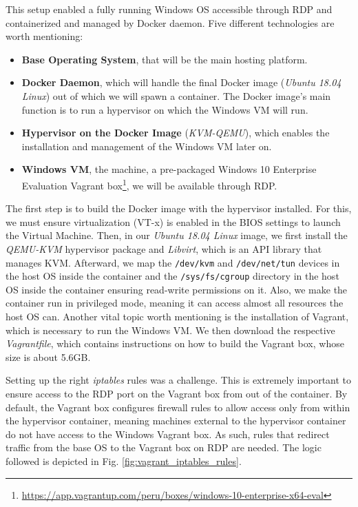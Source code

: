 This setup enabled a fully running Windows OS accessible through RDP and containerized and managed by Docker daemon. Five different technologies are worth mentioning:

\begin{itemize}
    \item \textbf{Base Operating System}, that will be the main hosting platform.
    \item \textbf{Docker Daemon}, which will handle the final Docker image (\textit{Ubuntu 18.04 Linux}) out of which we will spawn a container. The Docker image's main function is to run a hypervisor on which the Windows VM will run.
    \item \textbf{Hypervisor on the Docker Image} (\textit{KVM-QEMU}), which enables the installation and management of the Windows VM later on.
    \item \textbf{Windows VM}, the machine, a pre-packaged Windows 10 Enterprise Evaluation Vagrant box\footnote{\url{https://app.vagrantup.com/peru/boxes/windows-10-enterprise-x64-eval}}, we will be available through RDP.
\end{itemize}

The first step is to build the Docker image with the hypervisor installed. For this, we must ensure virtualization (VT-x) is enabled in the BIOS settings to launch the Virtual Machine. Then, in our \textit{Ubuntu 18.04 Linux} image, we first install the \textit{QEMU-KVM} hypervisor package and \textit{Libvirt}, which is an API library that manages KVM. Afterward, we map the \texttt{/dev/kvm} and \texttt{/dev/net/tun} devices in the host OS inside the container and the \texttt{/sys/fs/cgroup} directory in the host OS inside the container ensuring read-write permissions on it. Also, we make the container run in privileged mode, meaning it can access almost all resources the host OS can. Another vital topic worth mentioning is the installation of Vagrant, which is necessary to run the Windows VM. We then download the respective \textit{Vagrantfile}, which contains instructions on how to build the Vagrant box, whose size is about 5.6GB.

Setting up the right \textit{iptables} rules was a challenge. This is extremely important to ensure access to the RDP port on the Vagrant box from out of the container. By default, the Vagrant box configures firewall rules to allow access only from within the hypervisor container, meaning machines external to the hypervisor container do not have access to the Windows Vagrant box. As such, rules that redirect traffic from the base OS to the Vagrant box on RDP are needed. The logic followed is depicted in Fig. \ref{fig:vagrant_iptables_rules}.

